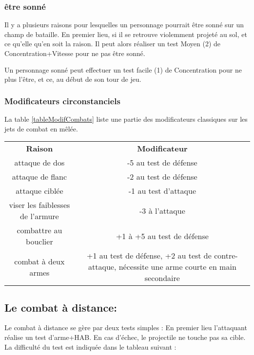 \documentclass[10pt,a4paper,twocolumn]{book}
\begin{document}
\subsubsection{être sonné}
Il y a plusieurs raisons pour lesquelles un personnage pourrait être sonné sur un champ de bataille.
    En premier lieu, si il se retrouve violemment projeté au sol, et ce qu’elle qu’en soit la raison. Il peut alors réaliser un test Moyen (2) de Concentration+Vitesse pour ne pas être sonné.

Un personnage sonné peut effectuer un test facile (1) de Concentration pour ne plus l’être, et ce, au début de son tour de jeu.
\subsubsection{Modificateurs circonstanciels}
La table \ref{tableModifCombats} liste une partie des modificateurs classiques sur les jets de combat en mêlée.
\begin{table*}
\caption{ Modificateurs courants en combat :}
\label{tableModifCombats}
\begin{center}
\begin{tabular}{cc}
\textbf{Raison} & \textbf{Modificateur} \\
   attaque de dos & -5 au test de défense  \\
   attaque de flanc & -2 au test de défense  \\
   attaque ciblée & -1 au test d'attaque\\
   viser les faiblesses de l'armure & -3 à l'attaque\\
   combattre au bouclier & +1 à +5 au test de défense \\
   combat à deux armes & +1 au test de défense, +2 au test de contre-attaque, nécessite une arme courte en main secondaire\\
\end{tabular}
\end{center}
\end{table*}
\subsection{Le combat à distance:}
Le combat à distance se gère par deux tests simples :
En premier lieu l’attaquant réalise un test d’arme+HAB. En cas d’échec, le projectile ne touche pas sa cible. La difficulté du test est indiquée dans le tableau suivant :


\end{document}
